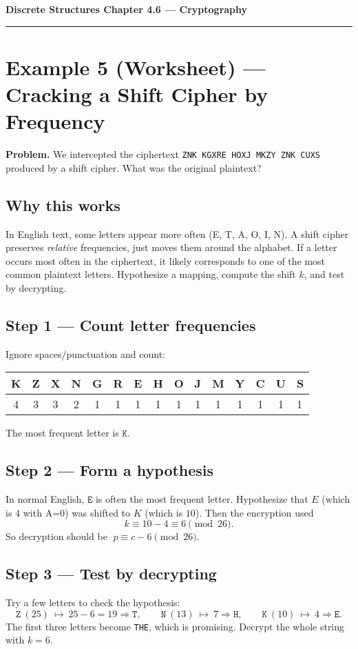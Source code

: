 \documentclass[12pt]{article}
\begin{document}
{\large \textbf{Discrete Structures \quad Chapter 4.6 — Cryptography}}

\hrule
\vspace{0.6em}

\section*{Example 5 (Worksheet) — Cracking a Shift Cipher by Frequency}

\textbf{Problem.} We intercepted the ciphertext \texttt{ZNK KGXRE HOXJ MKZY ZNK CUXS} produced by a shift cipher. What was the original plaintext?

\subsection*{Why this works}
In English text, some letters appear more often (E, T, A, O, I, N). A shift cipher preserves \emph{relative} frequencies, just moves them around the alphabet. If a letter occurs most often in the ciphertext, it likely corresponds to one of the most common plaintext letters. Hypothesize a mapping, compute the shift \(k\), and test by decrypting.

\subsection*{Step 1 — Count letter frequencies}
Ignore spaces/punctuation and count:

\medskip
\begin{tabular}{cccccccccccccc}
\toprule
K & Z & X & N & G & R & E & H & O & J & M & Y & C & U & S\\
 & 3 & 3 & 2 & 1 & 1 & 1 & 1 & 1 & 1 & 1 & 1 & 1 & 1 & 1\\
\bottomrule
\end{tabular}

\medskip
The most frequent letter is \(\texttt{K}\).

\subsection*{Step 2 — Form a hypothesis}
In normal English, \(\texttt{E}\) is often the most frequent letter. Hypothesize that \(E\) (which is \(4\) with A=0) was shifted to \(K\) (which is \(10\)). Then the encryption used
\[
k \equiv 10 - 4 \equiv 6 \pmod{26}.
\]
So decryption should be \(\;p \equiv c - 6 \pmod{26}\).

\subsection*{Step 3 — Test by decrypting}
Try a few letters to check the hypothesis:
\[
\texttt{Z}\ (25)\ \mapsto\ 25-6=19\Rightarrow \texttt{T},\qquad
\texttt{N}\ (13)\ \mapsto\ 7\Rightarrow \texttt{H},\qquad
\texttt{K}\ (10)\ \mapsto\ 4\Rightarrow \texttt{E}.
\]
The first three letters become \texttt{THE}, which is promising. Decrypt the whole string with \(k=6\).
\end{document}
